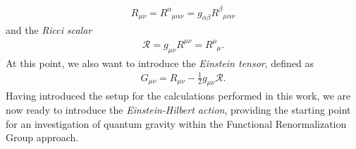\begin{align}
	R_{\mu\nu} = R^{\alpha}_{\phantom{\alpha}\mu\alpha\nu} = g_{\alpha\beta} R^{\beta}_{\phantom{\alpha}\mu\alpha\nu}
\end{align}
and the \textit{Ricci scalar} 
\begin{align}
\mathcal{R} = g_{\mu\nu}R^{\mu\nu} = R^{\mu}_{\phantom{\mu}\mu}.
\end{align}
At this point, we also want to introduce the \textit{Einstein tensor}, defined as
\begin{align}
	 G_{\mu\nu} = R_{\mu\nu} - \frac{1}{2}g_{\mu\nu}\mathcal{R}.
\end{align}
Having introduced the setup for the calculations performed in this work, we are now ready to introduce the \textit{Einstein-Hilbert action}, providing the starting point for an investigation of quantum gravity within the Functional Renormalization Group approach. 
